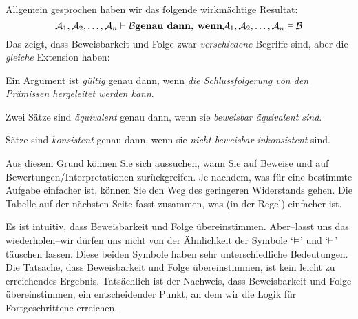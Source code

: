 Allgemein gesprochen haben wir das folgende wirkmächtige Resultat:
$$\mathcal{A}_1, \mathcal{A}_2, \ldots, \mathcal{A}_n \vdash\mathcal{B} \textbf{genau dann, wenn}\mathcal{A}_1, \mathcal{A}_2, \ldots, \mathcal{A}_n \vDash\mathcal{B}$$
Das zeigt, dass Beweisbarkeit und Folge zwar \emph{verschiedene} Begriffe sind, aber die \emph{gleiche} Extension haben:
	\begin{ebullet}
		\item Ein Argument ist \emph{gültig} genau dann, wenn \emph{die Schlussfolgerung von den Prämissen hergeleitet werden kann}.
		\item Zwei Sätze sind \emph{äquivalent} genau dann, wenn sie \emph{beweisbar äquivalent sind}.
		\item Sätze sind \emph{konsistent} genau dann, wenn sie \emph{nicht beweisbar inkonsistent} sind.
	\end{ebullet}
Aus diesem Grund können Sie sich aussuchen, wann Sie auf Beweise und auf Bewertungen/Interpretationen zurückgreifen. Je nachdem, was für eine bestimmte Aufgabe einfacher ist, können Sie den Weg des geringeren Widerstands gehen. Die Tabelle auf der nächsten Seite fasst zusammen, was (in der Regel) einfacher ist.

Es ist intuitiv, dass Beweisbarkeit und Folge übereinstimmen. Aber--lasst uns das wiederholen--wir dürfen uns nicht von der Ähnlichkeit der Symbole `$\vDash$' und `$\vdash$' täuschen lassen. Diese beiden Symbole haben sehr unterschiedliche Bedeutungen. Die Tatsache, dass Beweisbarkeit und Folge übereinstimmen, ist kein leicht zu erreichendes Ergebnis. Tatsächlich ist der Nachweis, dass Beweisbarkeit und Folge übereinstimmen, ein entscheidender Punkt, an dem wir die Logik für Fortgeschrittene erreichen.


